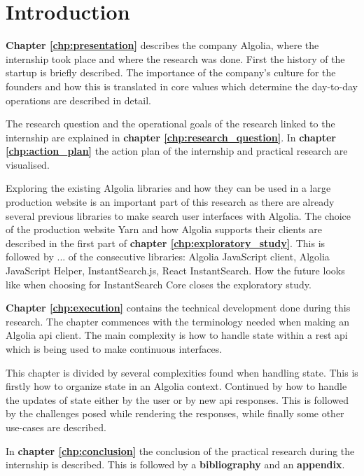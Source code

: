 
\chapter{Introduction} %
\label{chp:introduction}

\textbf{Chapter \ref{chp:presentation}} describes the company Algolia, where the internship took place and where the research was done. First the history of the startup is briefly described. The importance of the company's culture for the founders and how this is translated in core values which determine the day-to-day operations are described in detail.

The research question and the operational goals of the research linked to the internship are explained in \textbf{chapter \ref{chp:research_question}}. 
In \textbf{chapter \ref{chp:action_plan}} the action plan of the internship and practical research are visualised.

Exploring the existing Algolia libraries and how they can be used in a large production website is an important part of this research as there are already several previous libraries to make search user interfaces with Algolia. The choice of the production website Yarn\cite{yarn-site} and how Algolia supports their clients are described in the first part of \textbf{chapter \ref{chp:exploratory_study}}. This is followed by ... of the consecutive libraries: Algolia JavaScript client, Algolia JavaScript Helper, InstantSearch.js, React InstantSearch. How the future looks like when choosing for InstantSearch Core closes the exploratory study. %

\textbf{Chapter \ref{chp:execution}} contains the technical development done during this research. The chapter commences with the terminology needed when making an Algolia \acrshort{api} client. The main complexity is how to handle state within a \acrshort{rest} \acrshort{api} which is being used to make continuous interfaces. 

This chapter is divided by several complexities found when handling state. This is firstly how to organize state in an Algolia context. Continued by how to handle the updates of state either by the user or by new \acrshort{api} responses. This is followed by the challenges posed while rendering the responses, while finally some other use-cases are described.

In \textbf{chapter \ref{chp:conclusion}} the conclusion of the practical research during the internship is described. This is followed by a \textbf{bibliography} and an \textbf{appendix}.
